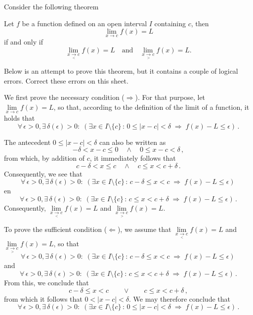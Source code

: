     

\begin{Exercise} %
Consider the following theorem
\begin{theorem}
Let $f$ be a function defined on an open interval $I$ containing $c$, then
$$\lim_{x\to c}f(x) = L$$ 
if and only if
$$\lim_{x\underset{<}{\rightarrow}c}f(x) = L \quad \text{and} \quad \lim_{x\underset{>}{\rightarrow}c}f(x) = L.$$
\end{theorem} 
Below is an attempt to prove this theorem, but it contains a couple of logical errors. Correct these errors on this sheet.

We first prove the necessary condition ($\Rightarrow$). For that purpose, let $\lim\limits_{x\to c}f(x) = L$, so that, according to the definition of the limit of a function, it holds that
$$
 \forall\,\epsilon > 0, \exists \, \delta(\epsilon) > 0  : \; \left(\exists x\in I\setminus\{c\}\,:\,
0\leq|x - c| < \delta \; \Rightarrow \; f(x) - L \leq \epsilon\right)\,.$$

The antecedent $0\leq|x - c| < \delta$ can also be written as
$$
-\delta<x - c \leq 0\quad\wedge \quad0\leq x-c<\delta\,,
$$
from which, by addition of $c$, it immediately follows that
$$
c-\delta<x  \leq c\quad\wedge\quad c\leq x<c+\delta\,.
$$
Consequently, we see that 
$$
 \forall\,\epsilon > 0, \exists \, \delta(\epsilon) > 0  : \; \left(\exists x\in I\setminus\{c\}\,:\,
c-\delta\leq x <c \; \Rightarrow \; f(x) - L \leq \epsilon\right)\,$$
en
$$
 \forall\,\epsilon > 0, \exists \, \delta(\epsilon) > 0  : \; \left(\exists x\in I\setminus\{c\}\,:\,
c\leq x <c+ \delta \; \Rightarrow \; f(x) - L \leq \epsilon\right)\,.$$
Consequently, $\lim\limits_{x\underset{<}{\rightarrow}c}f(x) = L$ and $\lim\limits_{x\underset{>}{\rightarrow}c}f(x) = L.$

To prove the sufficient condition ($\Leftarrow$), we assume that $\lim\limits_{x\underset{<}{\rightarrow}c}f(x) = L$ and $\lim\limits_{x\underset{>}{\rightarrow}c}f(x) = L$, so that
$$
 \forall\,\epsilon > 0, \exists \, \delta(\epsilon) > 0  : \; \left(\exists x\in I\setminus\{c\}\,:\,
c-\delta\leq x <c \; \Rightarrow \; f(x) - L \leq \epsilon\right)\,$$
and
$$
 \forall\,\epsilon > 0, \exists \, \delta(\epsilon) > 0  : \; \left(\exists x\in I\setminus\{c\}\,:\,
c\leq x <c+ \delta \; \Rightarrow \; f(x) - L \leq \epsilon\right)\,.$$
From this, we conclude that 
$$
c-\delta\leq x <c \qquad\vee\qquad c\leq x <c+ \delta\,,
$$
from which it follows that $0<|x-c|<\delta$. We may therefore conclude that
$$
 \forall\,\epsilon > 0, \exists \, \delta(\epsilon) > 0  : \; \left(\exists x\in I\setminus\{c\}\,:\,
0\leq|x - c| < \delta \; \Rightarrow \; f(x) - L \leq \epsilon\right)\,.$$
\end{Exercise} 

